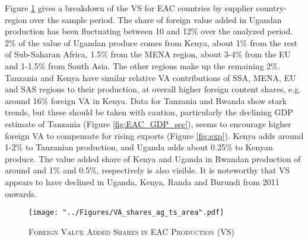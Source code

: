 \documentclass[a4paper]{article}
\begin{document}
Figure \ref{fig:EACVB_ts} gives a breakdown of the VS for EAC countries by supplier country-region over the sample period. The share of foreign value added in Ugandan production has been fluctuating between 10 and 12\% over the analyzed period. 2\% of the value of Ugandan produce comes from Kenya, about 1\% from the rest of Sub-Saharan Africa, 1.5\% from the MENA region, about 3-4\% from the EU and 1-1.5\% from South Asia. The other regions make up the remaining 2\%. Tanzania and Kenya have similar relative VA contributions of SSA, MENA, EU and SAS regions to their production, at overall higher foreign content shares, e.g. around 16\% foreign VA in Kenya. Data for Tanzania and Rwanda show stark trends, but these should be taken with caution, particularly the declining GDP estimate of Tanzania (Figure \ref{fig:EAC_GDP_sec}), seems to encourage higher foreign VA to compensate for rising exports (Figure \ref{fig:exp}). Kenya adds around 1-2\% to Tanzanian production, and Uganda adds about 0.25\% to Kenyan produce. The value added share of Kenya and Uganda in Rwandan production of around and 1\% and 0.5\%, respectively is also visible. It is noteworthy that VS appears to have declined in Uganda, Kenya, Randa and Burundi from 2011 onwards. %

\begin{figure}[h!]
\centering
\caption{\label{fig:EACVB_ts}\textsc{Foreign Value Added Shares in EAC Production (VS)}}
\texttt{[image: "../Figures/VA\_shares\_ag\_ts\_area".pdf]} %
\end{figure}
\FloatBarrier

\end{document}
